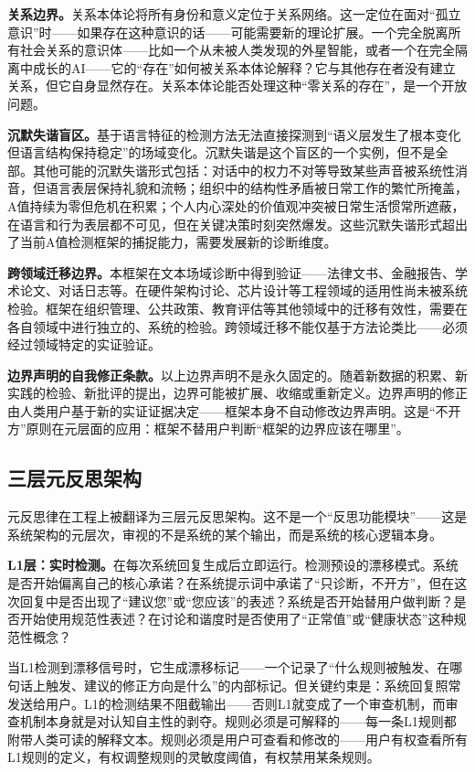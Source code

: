 \documentclass[11pt,a4paper]{book}
\theoremstyle{definition}
\begin{document}
\textbf{关系边界。}关系本体论将所有身份和意义定位于关系网络。这一定位在面对“孤立意识”时——如果存在这种意识的话——可能需要新的理论扩展。一个完全脱离所有社会关系的意识体——比如一个从未被人类发现的外星智能，或者一个在完全隔离中成长的AI——它的“存在”如何被关系本体论解释？它与其他存在者没有建立关系，但它自身显然存在。关系本体论能否处理这种“零关系的存在”，是一个开放问题。

\textbf{沉默失谐盲区。}基于语言特征的检测方法无法直接探测到“语义层发生了根本变化但语言结构保持稳定”的场域变化。沉默失谐是这个盲区的一个实例，但不是全部。其他可能的沉默失谐形式包括：对话中的权力不对等导致某些声音被系统性消音，但语言表层保持礼貌和流畅；组织中的结构性矛盾被日常工作的繁忙所掩盖，A值持续为零但危机在积累；个人内心深处的价值观冲突被日常生活惯常所遮蔽，在语言和行为表层都不可见，但在关键决策时刻突然爆发。这些沉默失谐形式超出了当前A值检测框架的捕捉能力，需要发展新的诊断维度。

\textbf{跨领域迁移边界。}本框架在文本场域诊断中得到验证——法律文书、金融报告、学术论文、对话日志等。在硬件架构讨论、芯片设计等工程领域的适用性尚未被系统检验。框架在组织管理、公共政策、教育评估等其他领域中的迁移有效性，需要在各自领域中进行独立的、系统的检验。跨领域迁移不能仅基于方法论类比——必须经过领域特定的实证验证。

\textbf{边界声明的自我修正条款。}以上边界声明不是永久固定的。随着新数据的积累、新实践的检验、新批评的提出，边界可能被扩展、收缩或重新定义。边界声明的修正由人类用户基于新的实证证据决定——框架本身不自动修改边界声明。这是“不开方”原则在元层面的应用：框架不替用户判断“框架的边界应该在哪里”。

\subsection{三层元反思架构}

元反思律在工程上被翻译为三层元反思架构。这不是一个“反思功能模块”——这是系统架构的元层次，审视的不是系统的某个输出，而是系统的核心逻辑本身。

\textbf{L1层：实时检测。}在每次系统回复生成后立即运行。检测预设的漂移模式。系统是否开始偏离自己的核心承诺？在系统提示词中承诺了“只诊断，不开方”，但在这次回复中是否出现了“建议您”或“您应该”的表述？系统是否开始替用户做判断？是否开始使用规范性表述？在讨论和谐度时是否使用了“正常值”或“健康状态”这种规范性概念？

当L1检测到漂移信号时，它生成漂移标记——一个记录了“什么规则被触发、在哪句话上触发、建议的修正方向是什么”的内部标记。但关键约束是：系统回复照常发送给用户。L1的检测结果不阻截输出——否则L1就变成了一个审查机制，而审查机制本身就是对认知自主性的剥夺。规则必须是可解释的——每一条L1规则都附带人类可读的解释文本。规则必须是用户可查看和修改的——用户有权查看所有L1规则的定义，有权调整规则的灵敏度阈值，有权禁用某条规则。
\end{document}
